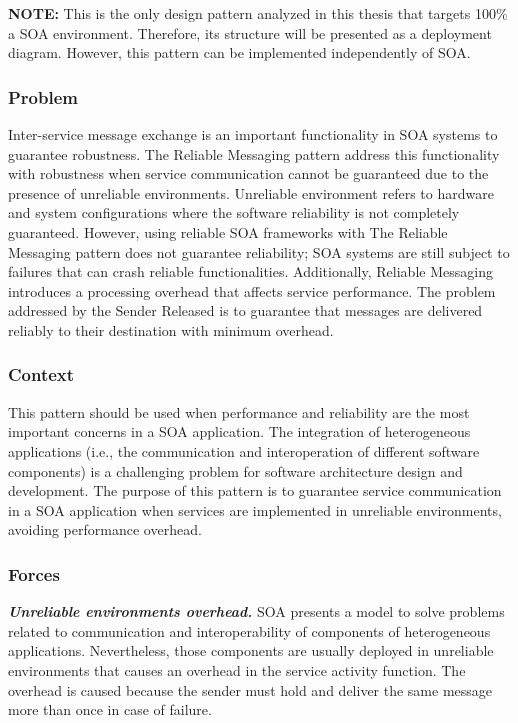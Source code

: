 \noindent\textbf{NOTE: }This is the only design pattern analyzed in this thesis that targets 100\% a SOA environment. Therefore, its structure will be presented as a deployment diagram. However, this pattern can be implemented independently of SOA. 

\subsubsection{Problem}

Inter-service message exchange is an important functionality in SOA systems to guarantee robustness. The Reliable Messaging pattern address this functionality with robustness when service communication cannot be guaranteed due to the presence of unreliable environments. Unreliable environment refers to hardware and system configurations where the software reliability is not completely guaranteed. However, using reliable SOA frameworks with The Reliable Messaging pattern does not guarantee reliability; SOA systems are still subject to failures that can crash reliable functionalities. Additionally, Reliable Messaging introduces a processing overhead that affects service performance. The problem addressed by the Sender Released is to guarantee that messages are delivered reliably to their destination with minimum overhead.

\subsubsection{Context}

This pattern should be used when performance and reliability are the most important concerns in a SOA application. The integration of heterogeneous applications (i.e., the communication and interoperation of different software components) is a challenging problem for software architecture design and development. The purpose of this pattern is to guarantee service communication in a SOA application when services are implemented in unreliable environments, avoiding performance overhead.


\subsubsection{Forces}

\noindent\textbf{\textit{Unreliable environments overhead. }} SOA presents a model to solve problems related to communication and interoperability of components of heterogeneous applications. Nevertheless, those components are usually deployed in unreliable environments that causes an overhead in the service activity function. The overhead is caused because the sender must hold and deliver the same message more than once in case of failure. \\

